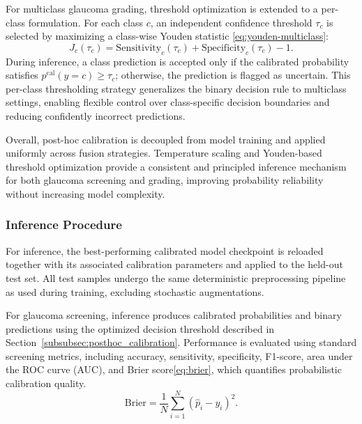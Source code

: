 \documentclass[preprint,12pt]{elsarticle}
\newcommand{\eqrefp}[1]{\eqref{#1}}
\begin{document}
For multiclass glaucoma grading, threshold optimization is extended to a per-class formulation. For each class $c$, an independent confidence threshold $\tau_c$ is selected by maximizing a class-wise Youden statistic \eqrefp{eq:youden-multiclass}:
\begin{equation}
    J_c(\tau_c) =
    \mathrm{Sensitivity}_c(\tau_c) + \mathrm{Specificity}_c(\tau_c) - 1.
    \label{eq:youden-multiclass}
\end{equation}
During inference, a class prediction is accepted only if the calibrated probability satisfies $p^{\text{cal}}(y=c) \ge \tau_c$; otherwise, the prediction is flagged as uncertain. This per-class thresholding strategy generalizes the binary decision rule to multiclass settings, enabling flexible control over class-specific decision boundaries and reducing confidently incorrect predictions.

Overall, post-hoc calibration is decoupled from model training and applied uniformly across fusion strategies. Temperature scaling and Youden-based threshold optimization provide a consistent and principled inference mechanism for both glaucoma screening and grading, improving probability reliability without increasing model complexity.


\subsubsection{Inference Procedure}
\label{subsubsec:inference}

For inference, the best-performing calibrated model checkpoint is reloaded together with its associated calibration parameters and applied to the held-out test set. All test samples undergo the same deterministic preprocessing pipeline as used during training, excluding stochastic augmentations.

For glaucoma screening, inference produces calibrated probabilities and binary predictions using the optimized decision threshold described in Section~\ref{subsubsec:posthoc_calibration}. Performance is evaluated using standard screening metrics, including accuracy, sensitivity, specificity, F1-score, area under the ROC curve (AUC), and Brier score\eqrefp{eq:brier}, which quantifies probabilistic calibration quality.
\begin{equation}
    \mathrm{Brier} = \frac{1}{N}\sum_{i=1}^{N} (\hat{p}_i - y_i)^2.
    \label{eq:brier}
\end{equation}
\end{document}
